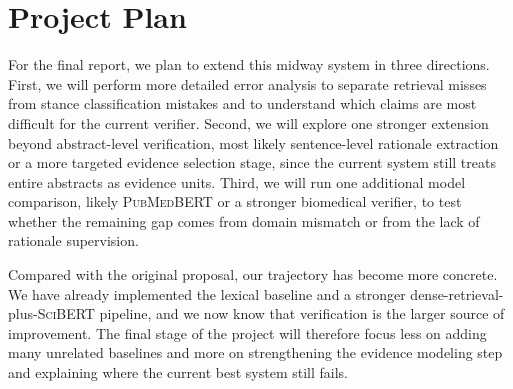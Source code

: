 \documentclass[11pt]{article}
\begin{document}
\section{Project Plan}
For the final report, we plan to extend this midway system in three directions. First, we will perform more detailed error analysis to separate retrieval misses from stance classification mistakes and to understand which claims are most difficult for the current verifier. Second, we will explore one stronger extension beyond abstract-level verification, most likely sentence-level rationale extraction or a more targeted evidence selection stage, since the current system still treats entire abstracts as evidence units. Third, we will run one additional model comparison, likely \textsc{PubMedBERT} or a stronger biomedical verifier, to test whether the remaining gap comes from domain mismatch or from the lack of rationale supervision.

Compared with the original proposal, our trajectory has become more concrete. We have already implemented the lexical baseline and a stronger dense-retrieval-plus-\textsc{SciBERT} pipeline, and we now know that verification is the larger source of improvement. The final stage of the project will therefore focus less on adding many unrelated baselines and more on strengthening the evidence modeling step and explaining where the current best system still fails.
\end{document}
